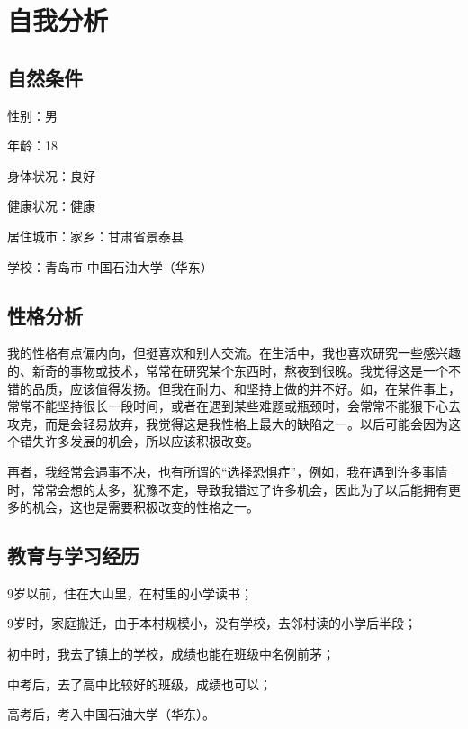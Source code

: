 \documentclass{article}
\begin{document}
\thispagestyle{empty}
\newpage
\setcounter{page}{1}
\section{自我分析}
\subsection{自然条件}
性别：男\par
年龄：18\par
身体状况：良好\par
健康状况：健康\par
居住城市：家乡：甘肃省景泰县\par
          学校：青岛市 中国石油大学（华东）\par 
\subsection{性格分析}
\par
我的性格有点偏内向，但挺喜欢和别人交流。在生活中，我也喜欢研究一些感兴趣的、新奇的事物或技术，常常在研究某个东西时，熬夜到很晚。我觉得这是一个不错的品质，应该值得发扬。但我在耐力、和坚持上做的并不好。如，在某件事上，常常不能坚持很长一段时间，或者在遇到某些难题或瓶颈时，会常常不能狠下心去攻克，而是会轻易放弃，我觉得这是我性格上最大的缺陷之一。以后可能会因为这个错失许多发展的机会，所以应该积极改变。\par
再者，我经常会遇事不决，也有所谓的“选择恐惧症”，例如，我在遇到许多事情时，常常会想的太多，犹豫不定，导致我错过了许多机会，因此为了以后能拥有更多的机会，这也是需要积极改变的性格之一。
\par
\subsection{教育与学习经历}
\par
9岁以前，住在大山里，在村里的小学读书；\par
9岁时，家庭搬迁，由于本村规模小，没有学校，去邻村读的小学后半段；\par
初中时，我去了镇上的学校，成绩也能在班级中名例前茅；\par
中考后，去了高中比较好的班级，成绩也可以；\par
高考后，考入中国石油大学（华东）。\par
\end{document}

